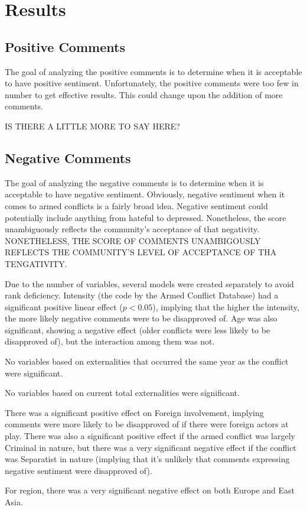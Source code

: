 \section{Results}
\subsection{Positive Comments}
The goal of analyzing the positive comments is to determine when it is acceptable to have positive sentiment. Unfortunately, the positive comments were too few in number to get effective results. This could change upon the addition of more comments.

IS THERE A LITTLE MORE TO SAY HERE?

\subsection{Negative Comments}
The goal of analyzing the negative comments is to determine when it is acceptable to have negative sentiment. Obviously, negative sentiment when it comes to armed conflicts is a fairly broad idea. Negative sentiment could potentially include anything from hateful to depressed. Nonetheless, the score unambiguously reflects the community's acceptance of that negativity. NONETHELESS, THE SCORE OF COMMENTS UNAMBIGOUSLY REFLECTS THE COMMUNITY'S LEVEL OF ACCEPTANCE OF THA TENGATIVITY.

Due to the number of variables, several models were created separately to avoid rank deficiency. Intensity (the code by the Armed Conflict Database) had a significant positive linear effect ($p < 0.05$), implying that the higher the intensity, the more likely negative comments were to be disapproved of. Age was also significant, showing a negative effect (older conflicts were less likely to be disapproved of), but the interaction among them was not.

No variables based on externalities that occurred the same year as the conflict were significant.

No variables based on current total externalities were significant.

There was a significant positive effect on Foreign involvement, implying comments were more likely to be disapproved of if there were foreign actors at play. There was also a significant positive effect if the armed conflict was largely Criminal in nature, but there was a very significant negative effect if the conflict was Separatist in nature (implying that it's unlikely that comments expressing negative sentiment were disapproved of).

For region, there was a very significant negative effect on both Europe and East Asia.